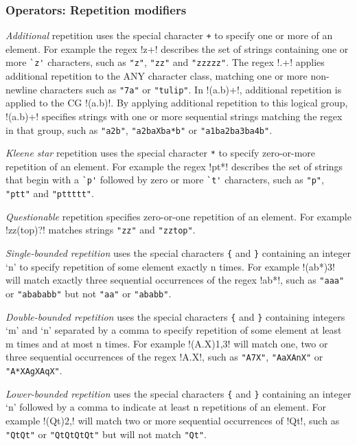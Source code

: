 \subsubsection*{Operators: Repetition modifiers}
\begin{description} \itemsep -1pt
\item[ADD:] \emph{Additional} repetition uses the special character \verb!+! to specify one or more of an element.  For example the regex \cverb!z+! describes the set of strings containing one or more \verb!`z'! characters, such as \verb!"z"!, \verb!"zz"! and \verb!"zzzzz"!.  The regex \cverb!.+! applies additional repetition to the ANY character class, matching one or more non-newline characters such as \verb!"7a"! or \verb!"tulip"!.  In \cverb!(a.b)+!, additional repetition is applied to the CG \cverb!(a.b)!.   By applying additional repetition to this logical group, \cverb!(a.b)+! specifies strings with one or more sequential strings matching the regex in that group, such as \verb!"a2b"!, \verb!"a2baXba*b"! or \verb!"a1ba2ba3ba4b"!.
\item[KLE:] \emph{Kleene star} repetition uses the special character \verb!*! to specify zero-or-more repetition of an element.  For example the regex \cverb!pt*! describes the set of strings that begin with a \verb!`p'! followed by zero or more \verb!`t'! characters, such as \verb!"p"!, \verb!"ptt"! and \verb!"pttttt"!.
\item[QST:] \emph{Questionable} repetition specifies zero-or-one repetition of an element.  For example \cverb!zz(top)?! matches strings \verb!"zz"! and \verb!"zztop"!.
\item[SNG:] \emph{Single-bounded repetition} uses the special characters \verb!{! and \verb!}! containing an integer `n' to specify repetition of some element exactly n times.  For example \cverb!(ab*){3}! will match exactly three sequential occurrences of the regex \cverb!ab*!, such as \verb!"aaa"! or \verb!"abababb"! but not \verb!"aa"! or \verb!"ababb"!.
\item[DBB:] \emph{Double-bounded repetition} uses the special characters \verb!{! and \verb!}! containing integers `m' and `n' separated by a comma to specify repetition of some element at least m times and at most n times.  For example \cverb!(A.X){1,3}! will match one, two or three sequential occurrences of the regex \cverb!A.X!, such as \verb!"A7X"!, \verb!"AaXAnX"! or \verb!"A*XAgXAqX"!.
\item[LWB:] \emph{Lower-bounded repetition} uses the special characters \verb!{! and \verb!}! containing an integer `n' followed by a comma to indicate at least n repetitions of an element.  For example \cverb!(Qt){2,}! will match two or more sequential occurrences of \cverb!Qt!, such as \verb!"QtQt"! or \verb!"QtQtQtQt"! but will not match \verb!"Qt"!.

\end{description}
